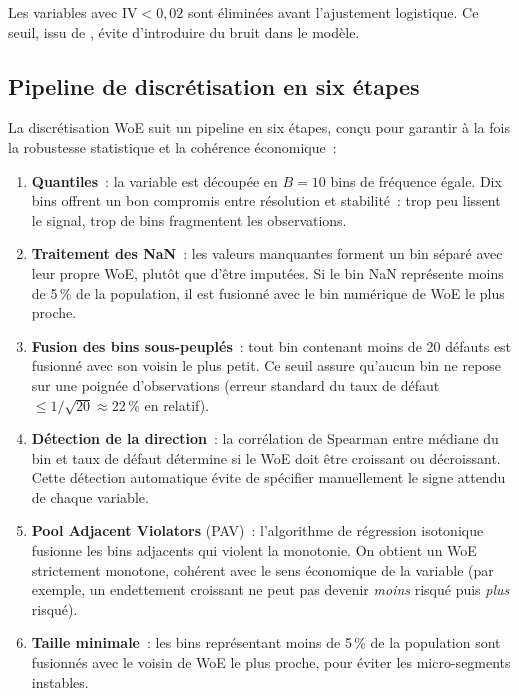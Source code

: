 \documentclass[12pt, a4paper, twoside, openright]{report}
\theoremstyle{definition}
\begin{document}
Les variables avec $\text{IV} < 0{,}02$ sont éliminées avant l'ajustement logistique. Ce seuil, issu de \citet{siddiqi2006}, évite d'introduire du bruit dans le modèle.

\subsection{Pipeline de discrétisation en six étapes}

La discrétisation WoE suit un pipeline en six étapes, conçu pour garantir à la fois la robustesse statistique et la cohérence économique~:

\begin{enumerate}
  \item \textbf{Quantiles}~: la variable est découpée en $B = 10$ bins de fréquence égale. Dix bins offrent un bon compromis entre résolution et stabilité~: trop peu lissent le signal, trop de bins fragmentent les observations.

  \item \textbf{Traitement des NaN}~: les valeurs manquantes forment un bin séparé avec leur propre WoE, plutôt que d'être imputées. Si le bin NaN représente moins de 5\,\% de la population, il est fusionné avec le bin numérique de WoE le plus proche.

  \item \textbf{Fusion des bins sous-peuplés}~: tout bin contenant moins de 20 défauts est fusionné avec son voisin le plus petit. Ce seuil assure qu'aucun bin ne repose sur une poignée d'observations (erreur standard du taux de défaut $\leq 1/\sqrt{20} \approx 22\,\%$ en relatif).

  \item \textbf{Détection de la direction}~: la corrélation de Spearman entre médiane du bin et taux de défaut détermine si le WoE doit être croissant ou décroissant. Cette détection automatique évite de spécifier manuellement le signe attendu de chaque variable.

  \item \textbf{Pool Adjacent Violators} (PAV)~: l'algorithme de régression isotonique fusionne les bins adjacents qui violent la monotonie. On obtient un WoE strictement monotone, cohérent avec le sens économique de la variable (par exemple, un endettement croissant ne peut pas devenir \emph{moins} risqué puis \emph{plus} risqué).

  \item \textbf{Taille minimale}~: les bins représentant moins de 5\,\% de la population sont fusionnés avec le voisin de WoE le plus proche, pour éviter les micro-segments instables.
\end{enumerate}
\end{document}
